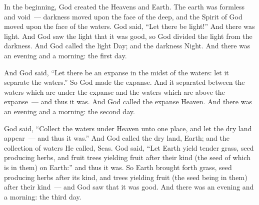 
\begin{inparaenum}
     In the beginning, God created the Heavens and Earth.%
     The earth was formless and void~--- darkness moved upon the face of the deep, and the Spirit of God moved upon the face of the waters.%
     God said, ``Let there be light!'' And there was light.%
     And God saw the light that it was good, so God divided the light from the darkness.%
     And God called the light Day; and the darkness Night. And there was an evening and a morning: the first day.%
    
     And God said, ``Let there be an expanse in the midst of the waters: let it separate the waters.''%
     So God made the expanse. And it separated between the waters which are under the expanse and the waters which are above the expanse~--- and thus it was.%
     And God called the expanse Heaven. And there was an evening and a morning: the second day.%
    
     God said, ``Collect the waters under Heaven unto one place, and let the dry land appear~--- and thus it was.''%
     And God called the dry land, Earth; and the collection of waters He called, Seas.%
     God said, ``Let Earth yield tender grass, seed producing herbs, and fruit trees yielding fruit after their kind (the seed of which is in them) on Earth:'' and thus it was.%
     So Earth brought forth grass, seed producing herbs after its kind, and trees yielding fruit (the seed being in them) after their kind~--- and God saw that it was good.%
     And there was an evening and a morning: the third day.%
    

\end{inparaenum}
